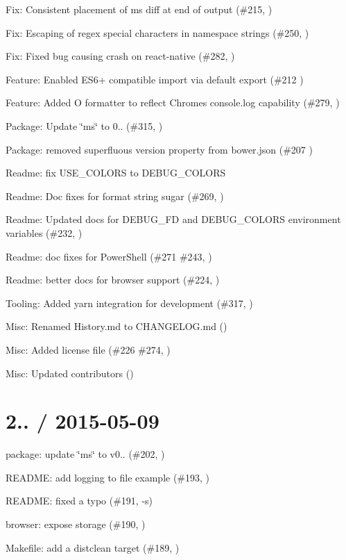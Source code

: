 \begin{DoxyItemize}
\item Fix\+: Consistent placement of ms diff at end of output (\#215, )
\item Fix\+: Escaping of regex special characters in namespace strings (\#250, )
\item Fix\+: Fixed bug causing crash on react-\/native (\#282, )
\item Feature\+: Enabled E\+S6+ compatible import via default export (\#212 )
\item Feature\+: Added O formatter to reflect Chrome\textquotesingle{}s console.\+log capability (\#279, )
\item Package\+: Update \char`\"{}ms\char`\"{} to 0.. (\#315, )
\item Package\+: removed superfluous version property from bower.\+json (\#207 )
\item Readme\+: fix U\+S\+E\+\_\+\+C\+O\+L\+O\+RS to D\+E\+B\+U\+G\+\_\+\+C\+O\+L\+O\+RS
\item Readme\+: Doc fixes for format string sugar (\#269, )
\item Readme\+: Updated docs for D\+E\+B\+U\+G\+\_\+\+FD and D\+E\+B\+U\+G\+\_\+\+C\+O\+L\+O\+RS environment variables (\#232, )
\item Readme\+: doc fixes for Power\+Shell (\#271 \#243,  )
\item Readme\+: better docs for browser support (\#224, )
\item Tooling\+: Added yarn integration for development (\#317, )
\item Misc\+: Renamed History.\+md to C\+H\+A\+N\+G\+E\+L\+O\+G.\+md ()
\item Misc\+: Added license file (\#226 \#274,  )
\item Misc\+: Updated contributors ()
\end{DoxyItemize}

\section*{2.. / 2015-\/05-\/09 }


\begin{DoxyItemize}
\item package\+: update \char`\"{}ms\char`\"{} to v0.. (\#202, )
\item R\+E\+A\+D\+ME\+: add logging to file example (\#193, )
\item R\+E\+A\+D\+ME\+: fixed a typo (\#191, -\/s)
\item browser\+: expose {\ttfamily storage} (\#190, )
\item Makefile\+: add a {\ttfamily distclean} target (\#189, )
\end{DoxyItemize}

